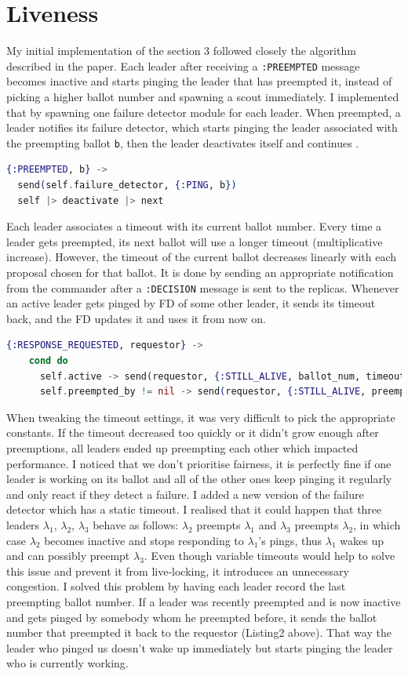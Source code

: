 \documentclass[11pt]{article}
\begin{document}
\pagebreak
\section*{Liveness}
My initial implementation of the section 3 followed closely the algorithm
described in the paper. Each leader after receiving a \texttt{:PREEMPTED}
message becomes inactive and starts pinging the leader that has preempted it,
instead of picking a higher ballot number and spawning a scout immediately. I
implemented that by spawning one failure detector module for each leader. When
preempted, a leader notifies its failure detector, which starts pinging the
leader associated with the preempting ballot \texttt{b}, then the leader
deactivates itself and continues .
\begin{lstlisting}[language=elixir, caption={New way of handling \texttt{:PREEMPTED} messages.},captionpos=b]
{:PREEMPTED, b} ->
  send(self.failure_detector, {:PING, b})
  self |> deactivate |> next
\end{lstlisting}
Each leader associates a timeout with its current ballot number. Every time a
leader gets preempted, its next ballot will use a longer timeout (multiplicative
increase). However, the timeout of the current ballot decreases linearly with each
proposal chosen for that ballot. It is done by sending an appropriate notification
from the commander after a \texttt{:DECISION} message is sent to the replicas.
Whenever an active leader gets pinged by FD of some other leader, it sends
its timeout back, and the FD updates it and uses it from now on.
\begin{lstlisting}[language=elixir, caption={Leader responding to a ping message.},captionpos=b]
{:RESPONSE_REQUESTED, requestor} ->
    cond do
      self.active -> send(requestor, {:STILL_ALIVE, ballot_num, timeout})
      self.preempted_by != nil -> send(requestor, {:STILL_ALIVE, preempted_by, timeout})
\end{lstlisting}
When tweaking the timeout settings, it was very difficult to pick the
appropriate constants. If the timeout decreased too quickly or it didn't grow
enough after preemptions, all leaders ended up preempting each other which
impacted performance. I noticed that we don't prioritise fairness, it is
perfectly fine if one leader is working on its ballot and all of the other ones
keep pinging it regularly and only react if they detect a failure. I added a
new version of the failure detector which has a static timeout. I realised that
it could happen that three leaders $\lambda_1$, $\lambda_2$,  $\lambda_3$
behave as follows: $\lambda_2$ preempts $\lambda_1$ and $\lambda_3$ preempts
$\lambda_2$, in which case $\lambda_2$ becomes inactive and stops responding to
$\lambda_1$'s pings, thus $\lambda_1$ wakes up and can possibly preempt
$\lambda_3$. Even though variable timeouts would help to solve this issue and
prevent it from live-locking, it introduces an unnecessary congestion. I solved
this problem by having each leader record the last preempting ballot number. If
a leader was recently preempted and is now inactive and gets pinged by somebody
whom he preempted before, it sends the ballot number that preempted it back to
the requestor (Listing2 above). That way the leader who pinged us doesn't wake up immediately
but starts pinging the leader who is currently working.
\pagebreak
\end{document}
